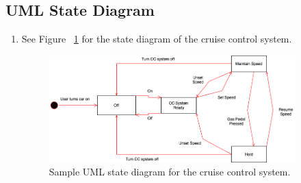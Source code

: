 \documentclass[preprint,11pt,3p]{article}
\begin{document}
\subsection{UML State Diagram}
\begin{enumerate}
	\item See Figure ~\ref{fig:stateUML} for the state diagram of the cruise control system.
			\begin{figure}[H]
				\includegraphics[width=0.9\textwidth]{images/stateUML.png}
				\caption{Sample UML state diagram for the cruise control system.}
				\label{fig:stateUML}
			\end{figure}
\end{enumerate}
\end{document}
